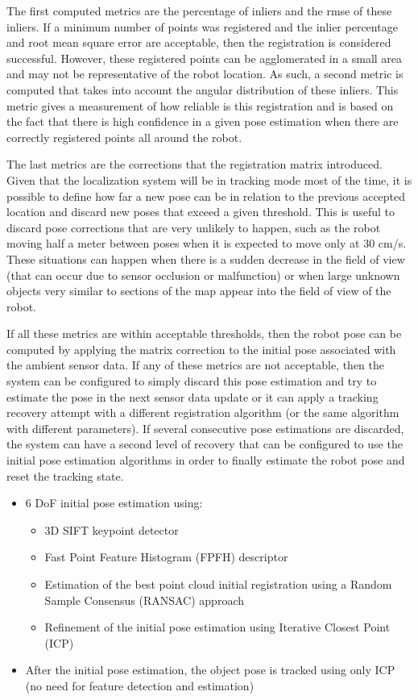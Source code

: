The first computed metrics are the percentage of inliers and the \gls{rmse} of these inliers. If a minimum number of points was registered and the inlier percentage and root mean square error are acceptable, then the registration is considered successful. However, these registered points can be agglomerated in a small area and may not be representative of the robot location. As such, a second metric is computed that takes into account the angular distribution of these inliers. This metric gives a measurement of how reliable is this registration and is based on the fact that there is high confidence in a given pose estimation when there are correctly registered points all around the robot.

The last metrics are the corrections that the registration matrix introduced. Given that the localization system will be in tracking mode most of the time, it is possible to define how far a new pose can be in relation to the previous accepted location and discard new poses that exceed a given threshold. This is useful to discard pose corrections that are very unlikely to happen, such as the robot moving half a meter between poses when it is expected to move only at 30 cm/s. These situations can happen when there is a sudden decrease in the field of view (that can occur due to sensor occlusion or malfunction) or when large unknown objects very similar to sections of the map appear into the field of view of the robot.

If all these metrics are within acceptable thresholds, then the robot pose can be computed by applying the matrix correction to the initial pose associated with the ambient sensor data. If any of these metrics are not acceptable, then the system can be configured to simply discard this pose estimation and try to estimate the pose in the next sensor data update or it can apply a tracking recovery attempt with a different registration algorithm (or the same algorithm with different parameters). If several consecutive pose estimations are discarded, the system can have a second level of recovery that can be configured to use the initial pose estimation algorithms in order to finally estimate the robot pose and reset the tracking state.


\begin{itemize}
	\item 6 DoF initial pose estimation using:
	\begin{itemize}
		\item 3D SIFT keypoint detector
		\item Fast Point Feature Histogram (FPFH) descriptor
		\item Estimation of the best point cloud initial registration using a Random Sample Consensus (RANSAC) approach
		\item Refinement of the initial pose estimation using Iterative Closest Point (ICP)
	\end{itemize}
	\item After the initial pose estimation, the object pose is tracked using only ICP (no need for feature detection and estimation)
\end{itemize}


